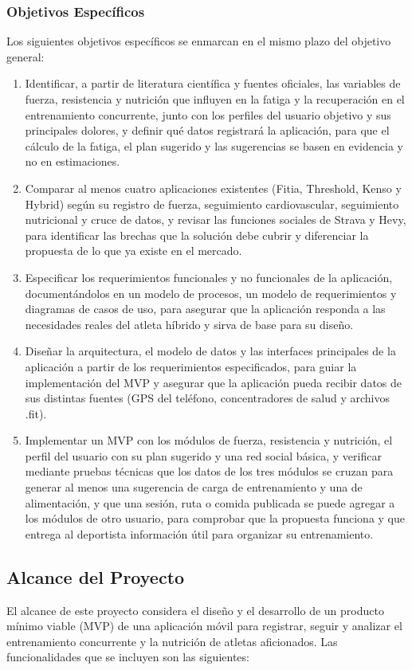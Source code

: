 \subsubsection{Objetivos Específicos}
Los siguientes objetivos específicos se enmarcan en el mismo plazo del objetivo general:
\begin{enumerate}
    \item Identificar, a partir de literatura científica y fuentes oficiales, las variables de fuerza, resistencia y nutrición que influyen en la fatiga y la recuperación en el entrenamiento concurrente, junto con los perfiles del usuario objetivo y sus principales dolores, y definir qué datos registrará la aplicación, para que el cálculo de la fatiga, el plan sugerido y las sugerencias se basen en evidencia y no en estimaciones.
    \item Comparar al menos cuatro aplicaciones existentes (Fitia, Threshold, Kenso y Hybrid) según su registro de fuerza, seguimiento cardiovascular, seguimiento nutricional y cruce de datos, y revisar las funciones sociales de Strava y Hevy, para identificar las brechas que la solución debe cubrir y diferenciar la propuesta de lo que ya existe en el mercado.
    \item Especificar los requerimientos funcionales y no funcionales de la aplicación, documentándolos en un modelo de procesos, un modelo de requerimientos y diagramas de casos de uso, para asegurar que la aplicación responda a las necesidades reales del atleta híbrido y sirva de base para su diseño.
    \item Diseñar la arquitectura, el modelo de datos y las interfaces principales de la aplicación a partir de los requerimientos especificados, para guiar la implementación del MVP y asegurar que la aplicación pueda recibir datos de sus distintas fuentes (GPS del teléfono, concentradores de salud y archivos .fit).
    \item Implementar un MVP con los módulos de fuerza, resistencia y nutrición, el perfil del usuario con su plan sugerido y una red social básica, y verificar mediante pruebas técnicas que los datos de los tres módulos se cruzan para generar al menos una sugerencia de carga de entrenamiento y una de alimentación, y que una sesión, ruta o comida publicada se puede agregar a los módulos de otro usuario, para comprobar que la propuesta funciona y que entrega al deportista información útil para organizar su entrenamiento.
\end{enumerate}

\subsection{Alcance del Proyecto}
El alcance de este proyecto considera el diseño y el desarrollo de un producto mínimo viable (MVP) de una aplicación móvil para registrar, seguir y analizar el entrenamiento concurrente y la nutrición de atletas aficionados. Las funcionalidades que se incluyen son las siguientes:

